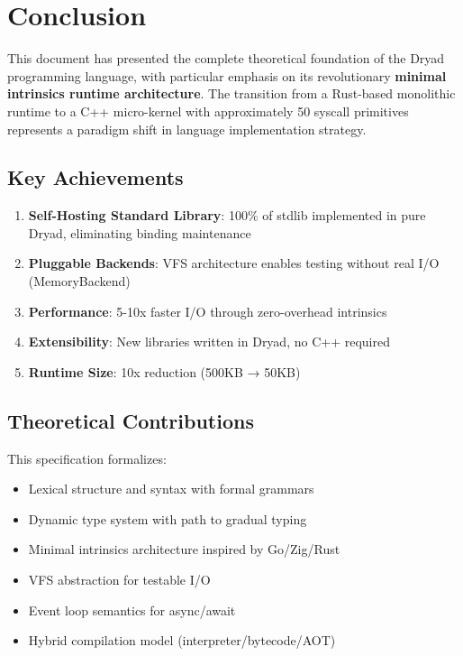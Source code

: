 \documentclass[12pt,a4paper]{article}
\theoremstyle{definition}
\begin{document}
\newpage

\section{Conclusion}

This document has presented the complete theoretical foundation of the Dryad programming language, with particular emphasis on its revolutionary \textbf{minimal intrinsics runtime architecture}. The transition from a Rust-based monolithic runtime to a C++ micro-kernel with approximately 50 syscall primitives represents a paradigm shift in language implementation strategy.

\subsection{Key Achievements}

\begin{enumerate}[leftmargin=*]
    \item \textbf{Self-Hosting Standard Library}: 100\% of stdlib implemented in pure Dryad, eliminating binding maintenance
    \item \textbf{Pluggable Backends}: VFS architecture enables testing without real I/O (MemoryBackend)
    \item \textbf{Performance}: 5-10x faster I/O through zero-overhead intrinsics
    \item \textbf{Extensibility}: New libraries written in Dryad, no C++ required
    \item \textbf{Runtime Size}: 10x reduction (500KB → 50KB)
\end{enumerate}

\subsection{Theoretical Contributions}

This specification formalizes:
\begin{itemize}[leftmargin=*]
    \item Lexical structure and syntax with formal grammars
    \item Dynamic type system with path to gradual typing
    \item Minimal intrinsics architecture inspired by Go/Zig/Rust
    \item VFS abstraction for testable I/O
    \item Event loop semantics for async/await
    \item Hybrid compilation model (interpreter/bytecode/AOT)
\end{itemize}
\end{document}
